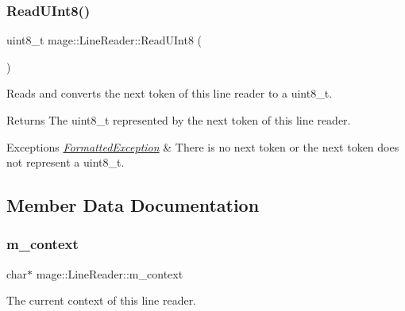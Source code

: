 \subsubsection{\texorpdfstring{Read\+U\+Int8()}{ReadUInt8()}}
{\footnotesize\ttfamily uint8\+\_\+t mage\+::\+Line\+Reader\+::\+Read\+U\+Int8 (\begin{DoxyParamCaption}{ }\end{DoxyParamCaption})\hspace{0.3cm}{\ttfamily [protected]}}

Reads and converts the next token of this line reader to a {\ttfamily uint8\+\_\+t}.

\begin{DoxyReturn}{Returns}
The {\ttfamily uint8\+\_\+t} represented by the next token of this line reader. 
\end{DoxyReturn}

\begin{DoxyExceptions}{Exceptions}
{\em \hyperlink{structmage_1_1_formatted_exception}{Formatted\+Exception}} & There is no next token or the next token does not represent a {\ttfamily uint8\+\_\+t}. \\
\hline
\end{DoxyExceptions}


\subsection{Member Data Documentation}
\hypertarget{classmage_1_1_line_reader_a2f1cfe313dc89741386178e63a6b8b0c}{}\label{classmage_1_1_line_reader_a2f1cfe313dc89741386178e63a6b8b0c} 
\subsubsection{\texorpdfstring{m\+\_\+context}{m\_context}}
{\footnotesize\ttfamily char$\ast$ mage\+::\+Line\+Reader\+::m\+\_\+context\hspace{0.3cm}{\ttfamily [protected]}}

The current context of this line reader. \hypertarget{classmage_1_1_line_reader_a6de3398ac59fdd98f8c40cff6f5c1075}{}\label{classmage_1_1_line_reader_a6de3398ac59fdd98f8c40cff6f5c1075} 
